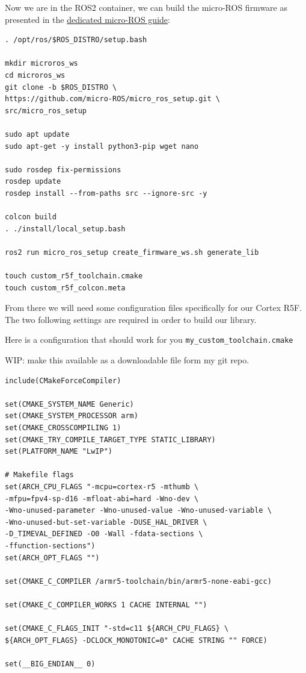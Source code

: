 \documentclass[10pt]{article}
\begin{document}
Now we are in the ROS2 container, we can build the micro-ROS firmware as presented in the \href{https://micro.ros.org/docs/tutorials/advanced/create\_custom\_static\_library}{dedicated micro-ROS guide}:
\begin{tcolorbox}
\begin{verbatim}
. /opt/ros/$ROS_DISTRO/setup.bash

mkdir microros_ws
cd microros_ws
git clone -b $ROS_DISTRO \
https://github.com/micro-ROS/micro_ros_setup.git \
src/micro_ros_setup

sudo apt update
sudo apt-get -y install python3-pip wget nano

sudo rosdep fix-permissions
rosdep update
rosdep install --from-paths src --ignore-src -y

colcon build
. ./install/local_setup.bash

ros2 run micro_ros_setup create_firmware_ws.sh generate_lib

touch custom_r5f_toolchain.cmake
touch custom_r5f_colcon.meta
\end{verbatim}
\end{tcolorbox}

From there we will need some configuration files specifically for
our Cortex R5F. The two following settings are required in order to build our library.

Here is a configuration that should work for you \verb|my_custom_toolchain.cmake|

WIP: make this available as a downloadable file form my git repo.
\begin{tcolorbox}
\begin{verbatim}
include(CMakeForceCompiler)

set(CMAKE_SYSTEM_NAME Generic)
set(CMAKE_SYSTEM_PROCESSOR arm)
set(CMAKE_CROSSCOMPILING 1)
set(CMAKE_TRY_COMPILE_TARGET_TYPE STATIC_LIBRARY)
set(PLATFORM_NAME "LwIP")

# Makefile flags
set(ARCH_CPU_FLAGS "-mcpu=cortex-r5 -mthumb \
-mfpu=fpv4-sp-d16 -mfloat-abi=hard -Wno-dev \
-Wno-unused-parameter -Wno-unused-value -Wno-unused-variable \
-Wno-unused-but-set-variable -DUSE_HAL_DRIVER \
-D_TIMEVAL_DEFINED -O0 -Wall -fdata-sections \
-ffunction-sections")
set(ARCH_OPT_FLAGS "")

set(CMAKE_C_COMPILER /armr5-toolchain/bin/armr5-none-eabi-gcc)

set(CMAKE_C_COMPILER_WORKS 1 CACHE INTERNAL "")

set(CMAKE_C_FLAGS_INIT "-std=c11 ${ARCH_CPU_FLAGS} \
${ARCH_OPT_FLAGS} -DCLOCK_MONOTONIC=0" CACHE STRING "" FORCE)

set(__BIG_ENDIAN__ 0)
\end{verbatim}
\end{tcolorbox}
\end{document}
